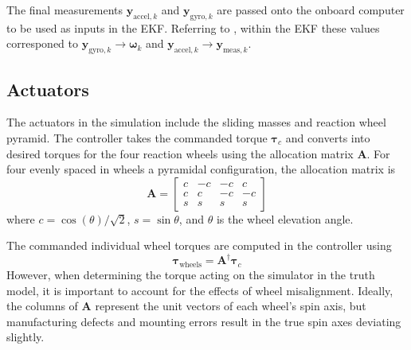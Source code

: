 The final measurements $\bm{y}_{\text{accel},k}$ and $\bm{y}_{\text{gyro},k}$ are passed onto the onboard computer to be used as inputs in the EKF. Referring to , within the EKF these values corresponed to $\bm{y}_{\text{gyro},k}\rightarrow\bm{\omega}_k$ and $\bm{y}_{\text{accel},k}\rightarrow\bm{y}_{\text{meas},k}$.

\subsection{Actuators}

The actuators in the simulation include the sliding masses and reaction wheel pyramid. The controller takes the commanded torque $\bm{\tau}_c$ and converts into desired torques for the four reaction wheels using the allocation matrix $\bm{A}$. For four evenly spaced in wheels a pyramidal configuration, the allocation matrix is
\begin{equation}
    \bm{A} = 
    \begin{bmatrix}
        c & -c & -c &  c \\
        c & c  & -c & -c \\
        s & s & s & s
    \end{bmatrix}
\end{equation}
where $c = \cos(\theta)/\sqrt{2}$, $s = \sin\theta$, and $\theta$ is the wheel elevation angle.

The commanded individual wheel torques are computed in the controller using 
\begin{equation}
    \bm{\tau}_\text{wheels} = \bm{A}^{\dagger}\bm{\tau}_c
\end{equation}
However, when determining the torque acting on the simulator in the truth model, it is important to account for the effects of wheel misalignment. Ideally, the columns of $\bm{A}$ represent the unit vectors of each wheel's spin axis, but manufacturing defects and mounting errors result in the true spin axes deviating slightly. 

